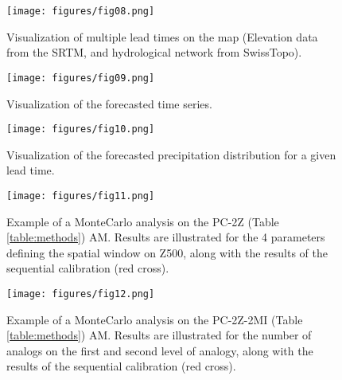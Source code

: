 \documentclass[review]{elsarticle}
\begin{document}
\begin{figure}[t]
	\texttt{[image: figures/fig08.png]}
	\caption{Visualization of multiple lead times on the map (Elevation data from the SRTM, and hydrological network from SwissTopo).}
	\label{figure:atmoswing-viewer-snail}
\end{figure}

\begin{figure}[t]
	\texttt{[image: figures/fig09.png]}
	\caption{Visualization of the forecasted time series.}
	\label{figure:atmoswing-viewer-timeseries}
\end{figure}

\begin{figure}[t]
	\texttt{[image: figures/fig10.png]}
	\caption{Visualization of the forecasted precipitation distribution for a given lead time.}
	\label{figure:atmoswing-viewer-distribution}
\end{figure}

\begin{figure}[t]
	\texttt{[image: figures/fig11.png]}
	\caption{Example of a Monte\textendash Carlo analysis on the PC-2Z (Table \ref{table:methods}) AM. Results are illustrated for the 4 parameters defining the spatial window on Z500, along with the results of the sequential calibration (red cross).}
	\label{figure:monte_carlo_r1}
\end{figure}

\begin{figure}[t]
	\texttt{[image: figures/fig12.png]}
	\caption{Example of a Monte\textendash Carlo analysis on the PC-2Z-2MI (Table \ref{table:methods}) AM. Results are illustrated for the number of analogs on the first and second level of analogy, along with the results of the sequential calibration (red cross).}
	\label{figure:monte_carlo_r2}
\end{figure}

\clearpage
\end{document}
